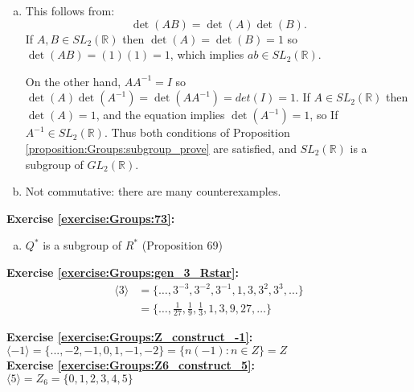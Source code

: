 \begin{enumerate}[(a)]
\item
This follows from:
$$\det(AB) = \det(A) \det(B).$$
If $A,B \in  SL_2({\mathbb R})$ then $\det(A) = \det(B) = 1$ so $\det(AB) = (1)(1) = 1$, which implies $ab \in SL_2({\mathbb R})$.

On the other hand, $A A^{-1} = I$ so $\det(A)\det(A^{-1}) = \det(AA^{-1}) = det(I) = 1.$ If $A \in  SL_2({\mathbb R})$ then $\det(A)=1$, and the equation implies $\det(A^{-1}) = 1$, so If $A^{-1} \in  SL_2({\mathbb R})$. Thus both conditions of Proposition \ref{proposition:Groups:subgroup_prove} are satisfied, and $SL_2({\mathbb R})$ is a subgroup of $GL_2({\mathbb R})$.

\item
Not commutative: there are many counterexamples.
\end{enumerate}

\noindent\textbf{Exercise \ref{exercise:Groups:73}:}
\begin{enumerate}[(a)]
\item
$Q^*$ is a subgroup of $R^*$ (Proposition 69)\\
\end{enumerate}

\noindent\textbf{Exercise \ref{exercise:Groups:gen_3_Rstar}:}
\begin{align*}
\langle 3 \rangle &= \{ \ldots, 3^{-3}, 3^{-2}, 3^{-1}, 1, 3, 3^2, 3^3, \ldots \}\\
&= \{ \ldots, \frac{1}{27}, \frac{1}{9}, \frac{1}{3}, 1, 3, 9, 27, \ldots \}
\end{align*}

\noindent\textbf{Exercise \ref{exercise:Groups:Z_construct_-1}:}\\
$\langle-1\rangle=\{...,-2,-1,0,1,-1,-2\}=\{n(-1):n\in Z\}=Z$\\

\noindent\textbf{Exercise \ref{exercise:Groups:Z6_construct_5}:}\\
$\langle 5\rangle=Z_6=\{0,1,2,3,4,5\}$\\

